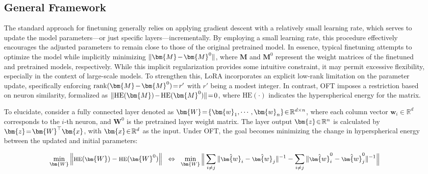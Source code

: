 \subsection{General Framework}

The standard approach for finetuning generally relies on applying gradient descent with a relatively small learning rate, which serves to update the model parameters—or just specific layers—incrementally. By employing a small learning rate, this procedure effectively encourages the adjusted parameters to remain close to those of the original pretrained model. In essence, typical finetuning attempts to optimize the model while implicitly minimizing $\thickmuskip=2mu \medmuskip=2mu \| \bm{M} - \bm{M}^0\|$, where $\bm{M}$ and $\bm{M}^0$ represent the weight matrices of the finetuned and pretrained models, respectively. While this implicit regularization provides some intuitive constraint, it may permit excessive flexibility, especially in the context of large-scale models. To strengthen this, LoRA incorporates an explicit low-rank limitation on the parameter update, specifically enforcing $\thickmuskip=2mu \medmuskip=2mu \text{rank}(\bm{M} - \bm{M}^0)=r'$ with $r'$ being a modest integer. In contrast, OFT imposes a restriction based on neuron similarity, formalized as $\thickmuskip=2mu \medmuskip=2mu \| \text{HE}(\bm{M})-\text{HE}(\bm{M}^0) \|=0$, where $\text{HE}(\cdot)$ indicates the hyperspherical energy for the matrix. 

To elucidate, consider a fully connected layer denoted as $\thickmuskip=2mu \medmuskip=2mu \bm{W}=\{\bm{w}_1,\cdots,\bm{w}_n\}\in\mathbb{R}^{d\times n}$, where each column vector $\bm{w}_i\in\mathbb{R}^{d}$ corresponds to the $i$-th neuron, and $\bm{W}^0$ is the pretrained layer weight matrix. The layer output $\thickmuskip=2mu \medmuskip=2mu \bm{z}\in\mathbb{R}^n$ is calculated by $\thickmuskip=2mu \medmuskip=2mu \bm{z}=\bm{W}^\top\bm{x}$, with $\thickmuskip=2mu \medmuskip=2mu \bm{x}\in\mathbb{R}^d$ as the input. Under OFT, the goal becomes minimizing the change in hyperspherical energy between the updated and initial parameters:

\begin{equation}\label{eq:oft_principle}
\footnotesize
\min_{\bm{W}} \left\| \text{HE}(\bm{W})-\text{HE}(\bm{W}^0)\right\|~~\Leftrightarrow~~\min_{\bm{W}} \bigg{\|} \sum_{i\neq j} \|\hat{\bm{w}}_i-\hat{\bm{w}}_j\|^{-1}-\sum_{i\neq j} \|\hat{\bm{w}}^0_i-\hat{\bm{w}}^0_j\|^{-1}\bigg{\|}
\end{equation}

